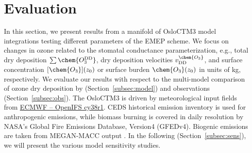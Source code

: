 \documentclass[gmd, manuscript]{copernicus}
\begin{document}
\section{Evaluation}
\label{sec:eval}
In this section, we present results from a manifold of OsloCTM3 model integrations testing different parameters of the EMEP scheme. We focus on changes in ozone related to the stomatal conductance parameterization, e.g., total dry deposition $\sum\chem{O_3^\text{DD}}$, dry deposition velocities $v^\chem{O_3}_\text{DD}$, and surface concentration $[\chem{O_3}](z_0)$ or surface burden $\chem{O_3}(z_0)$ in units of \unit{kg}, respectively. We evaluate our results with respect to the multi-model comparison of ozone dry deposition by \citet{ACP:Hardacre2015} (Section~\ref{subsec:model}) and observations (Section~\ref{subsec:obs}). The OsloCTM3 is driven by meteorological input fields from \href{https://www.ecmwf.int/en/forecasts/documentation-and-support/evolution-ifs/cycle-38r1-summary-changes}{ECMWF -- OpenIFS cy38r1}. CEDS historical emission inventory is used for anthropogenic emissions, while biomass burning is covered in daily resolution by NASA's Global Fire Emissions Database, Version4 (GFEDv4). Biogenic emissions are taken from MEGAN-MACC output \citep{ACP:Sindelarova2014}. In the following (Section~\ref{subsec:sens}), we will present the various model sensitivity studies.
\end{document}
